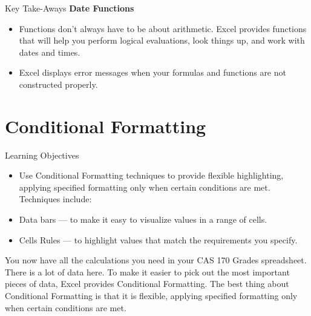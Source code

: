 \begin{center}
	\begin{tkwbox}{Key Take-Aways}
		\textbf{Date Functions}
		\\
		\begin{itemize}
			\setlength{\itemsep}{0pt}
			\setlength{\parskip}{0pt}
			\setlength{\parsep}{0pt}

			\item Functions don’t always have to be about arithmetic. Excel provides functions that will help you perform logical evaluations, look things up, and work with dates and times.
			\item Excel displays error messages when your formulas and functions are not constructed properly.
			
		\end{itemize}
	\end{tkwbox}
\end{center}


\section{Conditional Formatting}

\begin{center}
	\begin{objbox}{Learning Objectives}
		\begin{itemize}
			\setlength{\itemsep}{0pt}
			\setlength{\parskip}{0pt}
			\setlength{\parsep}{0pt}

			\item Use Conditional Formatting techniques to provide flexible highlighting, applying specified formatting only
			when certain conditions are met. Techniques include:
			
			\item Data bars — to make it easy to visualize values in a range of cells.
			
			\item Cells Rules — to highlight values that match the requirements you specify.
			
		\end{itemize}
	\end{objbox}
\end{center}







You now have all the calculations you need in your CAS 170 Grades spreadsheet. There is a lot of
data here. To make it easier to pick out the most important pieces of data, Excel provides Conditional
Formatting. The best thing about Conditional Formatting is that it is flexible, applying specified
formatting only when certain conditions are met.

